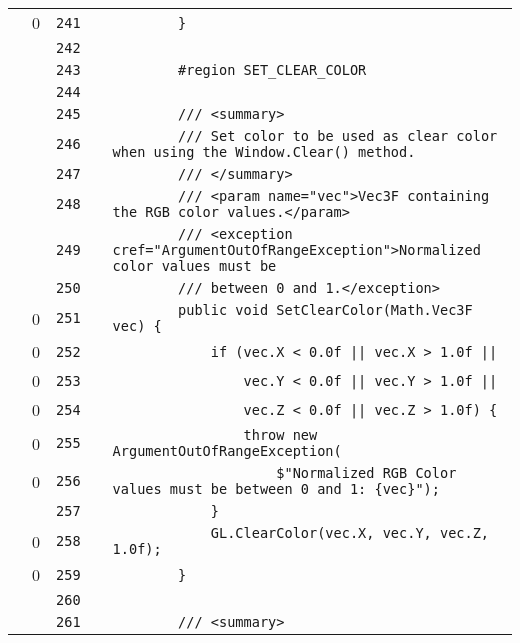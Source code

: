 \documentclass[a4paper,landscape,10pt]{article}
\begin{document}
\begin{longtable}[l]{lrrll}
\cellcolor{red} & 0 & \verb~241~ & & \verb~        }~\\
\cellcolor{gray} &  & \verb~242~ & & \verb~~\\
\cellcolor{gray} &  & \verb~243~ & & \verb~        #region SET_CLEAR_COLOR~\\
\cellcolor{gray} &  & \verb~244~ & & \verb~~\\
\cellcolor{gray} &  & \verb~245~ & & \verb~        /// <summary>~\\
\cellcolor{gray} &  & \verb~246~ & & \verb~        /// Set color to be used as clear color when using the Window.Clear() method.~\\
\cellcolor{gray} &  & \verb~247~ & & \verb~        /// </summary>~\\
\cellcolor{gray} &  & \verb~248~ & & \verb~        /// <param name="vec">Vec3F containing the RGB color values.</param>~\\
\cellcolor{gray} &  & \verb~249~ & & \verb~        /// <exception cref="ArgumentOutOfRangeException">Normalized color values must be~\\
\cellcolor{gray} &  & \verb~250~ & & \verb~        /// between 0 and 1.</exception>~\\
\cellcolor{red} & 0 & \verb~251~ & & \verb~        public void SetClearColor(Math.Vec3F vec) {~\\
\cellcolor{red} & 0 & \verb~252~ & & \verb~            if (vec.X < 0.0f || vec.X > 1.0f ||~\\
\cellcolor{red} & 0 & \verb~253~ & & \verb~                vec.Y < 0.0f || vec.Y > 1.0f ||~\\
\cellcolor{red} & 0 & \verb~254~ & & \verb~                vec.Z < 0.0f || vec.Z > 1.0f) {~\\
\cellcolor{red} & 0 & \verb~255~ & & \verb~                throw new ArgumentOutOfRangeException(~\\
\cellcolor{red} & 0 & \verb~256~ & & \verb~                    $"Normalized RGB Color values must be between 0 and 1: {vec}");~\\
\cellcolor{gray} &  & \verb~257~ & & \verb~            }~\\
\cellcolor{red} & 0 & \verb~258~ & & \verb~            GL.ClearColor(vec.X, vec.Y, vec.Z, 1.0f);~\\
\cellcolor{red} & 0 & \verb~259~ & & \verb~        }~\\
\cellcolor{gray} &  & \verb~260~ & & \verb~~\\
\cellcolor{gray} &  & \verb~261~ & & \verb~        /// <summary>~\\

\end{longtable}
\end{document}
